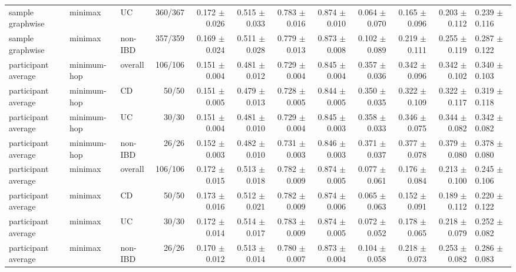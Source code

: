 \begin{table}[ht]
{\begin{tabular}{lllrrrrrrrr}
sample graphwise & minimax & UC & 360/367 & 0.172 $\pm$ 0.026 & 0.515 $\pm$ 0.033 & 0.783 $\pm$ 0.016 & 0.874 $\pm$ 0.010 & 0.064 $\pm$ 0.070 & 0.165 $\pm$ 0.096 & 0.203 $\pm$ 0.112 & 0.239 $\pm$ 0.116 \\
sample graphwise & minimax & non-IBD & 357/359 & 0.169 $\pm$ 0.024 & 0.511 $\pm$ 0.028 & 0.779 $\pm$ 0.013 & 0.873 $\pm$ 0.008 & 0.102 $\pm$ 0.089 & 0.219 $\pm$ 0.111 & 0.255 $\pm$ 0.119 & 0.287 $\pm$ 0.122 \\
participant average & minimum-hop & overall & 106/106 & 0.151 $\pm$ 0.004 & 0.481 $\pm$ 0.012 & 0.729 $\pm$ 0.004 & 0.845 $\pm$ 0.004 & 0.357 $\pm$ 0.036 & 0.342 $\pm$ 0.096 & 0.342 $\pm$ 0.102 & 0.340 $\pm$ 0.103 \\
participant average & minimum-hop & CD & 50/50 & 0.151 $\pm$ 0.005 & 0.479 $\pm$ 0.013 & 0.728 $\pm$ 0.005 & 0.844 $\pm$ 0.005 & 0.350 $\pm$ 0.035 & 0.322 $\pm$ 0.109 & 0.322 $\pm$ 0.117 & 0.319 $\pm$ 0.118 \\
participant average & minimum-hop & UC & 30/30 & 0.151 $\pm$ 0.004 & 0.481 $\pm$ 0.010 & 0.729 $\pm$ 0.004 & 0.845 $\pm$ 0.003 & 0.358 $\pm$ 0.033 & 0.346 $\pm$ 0.075 & 0.344 $\pm$ 0.082 & 0.342 $\pm$ 0.082 \\
participant average & minimum-hop & non-IBD & 26/26 & 0.152 $\pm$ 0.003 & 0.482 $\pm$ 0.010 & 0.731 $\pm$ 0.003 & 0.846 $\pm$ 0.003 & 0.371 $\pm$ 0.037 & 0.377 $\pm$ 0.078 & 0.379 $\pm$ 0.080 & 0.378 $\pm$ 0.080 \\
participant average & minimax & overall & 106/106 & 0.172 $\pm$ 0.015 & 0.513 $\pm$ 0.018 & 0.782 $\pm$ 0.009 & 0.874 $\pm$ 0.005 & 0.077 $\pm$ 0.061 & 0.176 $\pm$ 0.084 & 0.213 $\pm$ 0.100 & 0.245 $\pm$ 0.106 \\
participant average & minimax & CD & 50/50 & 0.173 $\pm$ 0.016 & 0.512 $\pm$ 0.021 & 0.782 $\pm$ 0.009 & 0.874 $\pm$ 0.006 & 0.065 $\pm$ 0.063 & 0.152 $\pm$ 0.091 & 0.189 $\pm$ 0.112 & 0.220 $\pm$ 0.122 \\
participant average & minimax & UC & 30/30 & 0.172 $\pm$ 0.014 & 0.514 $\pm$ 0.017 & 0.783 $\pm$ 0.009 & 0.874 $\pm$ 0.005 & 0.072 $\pm$ 0.052 & 0.178 $\pm$ 0.065 & 0.218 $\pm$ 0.079 & 0.252 $\pm$ 0.082 \\
participant average & minimax & non-IBD & 26/26 & 0.170 $\pm$ 0.012 & 0.513 $\pm$ 0.014 & 0.780 $\pm$ 0.007 & 0.873 $\pm$ 0.004 & 0.104 $\pm$ 0.058 & 0.218 $\pm$ 0.073 & 0.253 $\pm$ 0.082 & 0.286 $\pm$ 0.083 \\
\bottomrule
\end{tabular}%
}
\end{table}
